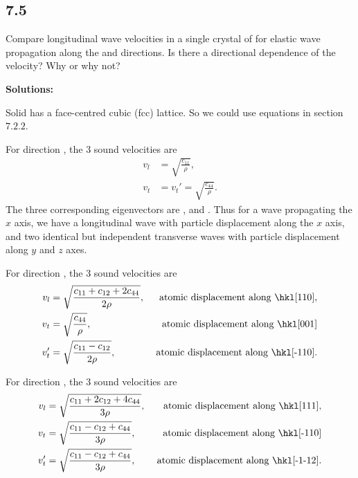 \documentclass[12pt]{article}
\begin{document}
\subsection{7.5}
Compare longitudinal wave velocities in a single crystal of  for elastic wave
propagation along the \hkl[100] and \hkl[110] directions.  Is there a directional dependence of the velocity?
Why or why not?

\textbf{Solutions:}

Solid  has a face-centred cubic (fcc) lattice. So we could use
equations in section $7.2.2$.

For direction \hkl[100], the $3$ sound velocities are
\begin{align}
  v_l & = \sqrt{\frac{ c_{11} }{ \rho }}, \\
  v_t & = v_t' = \sqrt{\frac{ c_{44} }{ \rho }}.
\end{align}
The three corresponding eigenvectors are \hkl[100], \hkl[010] and \hkl[001].
Thus for a wave propagating the $x$ axis, we have a longitudinal wave with particle displacement along the
$x$ axis, and two identical but independent transverse waves with particle displacement along $y$ and $z$ axes.

For direction \hkl[110], the $3$ sound velocities are
\begin{align}
  v_l  & = \sqrt{\frac{ c_{11} + c_{12} + 2 c_{44} }{ 2 \rho }}, & \text{atomic displacement along \hkl[110]},   \\
  v_t  & = \sqrt{\frac{ c_{44} }{ \rho }},                       & \text{ atomic displacement along \hkl[001]}   \\
  v_t' & = \sqrt{\frac{ c_{11} - c_{12} }{ 2 \rho }},            & \text{ atomic displacement along \hkl[-110]}.
\end{align}

For direction \hkl[111], the $3$ sound velocities are
\begin{align}
  v_l  & = \sqrt{\frac{ c_{11} + 2 c_{12} + 4 c_{44} }{ 3 \rho }}, & \text{atomic displacement along \hkl[111]},    \\
  v_t  & = \sqrt{\frac{ c_{11} - c_{12} + c_{44} }{ 3 \rho }},     & \text{ atomic displacement along \hkl[-110]}   \\
  v_t' & = \sqrt{\frac{ c_{11} - c_{12} + c_{44} }{ 3 \rho }},     & \text{ atomic displacement along \hkl[-1-12]}.
\end{align}
\end{document}
